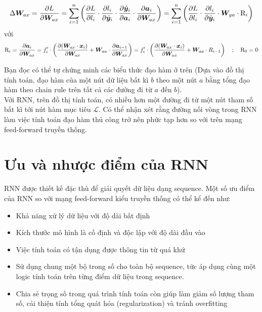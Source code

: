      $$\Delta \bm W_{ax} = \frac{\partial L}{\partial \bm W_{ax}}  = \sum_{i=1}^{n}\left(
        \frac{\partial L}{\partial l_i} \cdot
        \frac{\partial l_i}{\partial \hat{\bm y}_i} \cdot
        \frac{\partial \hat{\bm y}_i}{\partial \bm a_i} \cdot
        \frac{\partial \bm a_i}{\partial \bm W_{ax}}
     \right) = \sum_{i=1}^{n}\left(
        \frac{\partial L}{\partial l_i} \cdot
        \frac{\partial l_i}{\partial \hat{\bm y}_i} \cdot
        \bm W_{ya} \cdot \text R_i
     \right)$$
     với 
     $$\text R_i = \frac{\partial \bm a_i}{\partial \bm W_{ax}} = f_i' \cdot \left(\frac{\partial (\bm W_{ax}\cdot \bm x_i)}{\partial \bm W_{ax}} + \bm W_{aa} \cdot \frac{\partial \bm a_{i-1}}{\partial \bm W_{ax}}\right) = f_i' \cdot \left(\frac{\partial (\bm W_{ax}\cdot \bm x_i)}{\partial \bm W_{ax}} + \bm W_{aa} \cdot R_{i-1}\right) \quad ;\quad  \text R_0 = 0 $$
     
Bạn đọc có thể tự chứng minh các biểu thức đạo hàm ở trên (Dựa vào đồ thị tính toán, đạo hàm của một nút dữ liệu bất kì $b$ theo một nút $a$ bằng tổng đạo hàm theo chain rule trên tất cả các đường đi từ $a$ đến $b$).\\
Với RNN, trên đồ thị tính toán, có nhiều hơn một đường đi từ một nút tham số bất kì tới nút hàm mục tiêu $\mathcal{L}$. Có thể nhận xét rằng đường nối vòng trong RNN làm việc tính toán đạo hàm thủ công trở nên phức tạp hơn so với trên mạng feed-forward truyền thống.

\section{Ưu và nhược điểm của RNN}
RNN được thiết kế đặc thù để giải quyết dữ liệu dạng sequence. Một số ưu điểm của RNN so với mạng feed-forward kiểu truyền thống có thể kể đến như:
\begin{itemize}
    \item Khả năng xử lý dữ liệu với độ dài bất định
    \item Kích thước mô hình là cố định và độc lập với độ dài đầu vào 
    \item Việc tính toán có tận dụng được thông tin từ quá khứ
    \item Sử dụng chung một bộ trong số cho toàn bộ sequence, tức áp dụng cùng một logic tính toán trên từng điểm dữ liệu trong sequence.
    \item Chia sẻ trọng số trong quá trình tính toán còn giúp làm giảm số lượng tham số, cải thiện tính tổng quát hóa (regularization) và tránh overfitting
\end{itemize}

